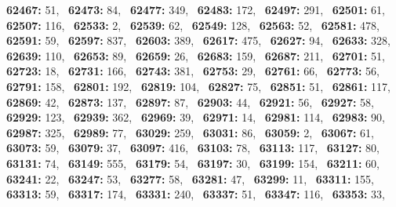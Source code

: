 \textbf{62467:} 51,\allowbreak~ 
\textbf{62473:} 84,\allowbreak~ 
\textbf{62477:} 349,\allowbreak~ 
\textbf{62483:} 172,\allowbreak~ 
\textbf{62497:} 291,\allowbreak~ 
\textbf{62501:} 61,\allowbreak~ 
\textbf{62507:} 116,\allowbreak~ 
\textbf{62533:} 2,\allowbreak~ 
\textbf{62539:} 62,\allowbreak~ 
\textbf{62549:} 128,\allowbreak~ 
\textbf{62563:} 52,\allowbreak~ 
\textbf{62581:} 478,\allowbreak~ 
\textbf{62591:} 59,\allowbreak~ 
\textbf{62597:} 837,\allowbreak~ 
\textbf{62603:} 389,\allowbreak~ 
\textbf{62617:} 475,\allowbreak~ 
\textbf{62627:} 94,\allowbreak~ 
\textbf{62633:} 328,\allowbreak~ 
\textbf{62639:} 110,\allowbreak~ 
\textbf{62653:} 89,\allowbreak~ 
\textbf{62659:} 26,\allowbreak~ 
\textbf{62683:} 159,\allowbreak~ 
\textbf{62687:} 211,\allowbreak~ 
\textbf{62701:} 51,\allowbreak~ 
\textbf{62723:} 18,\allowbreak~ 
\textbf{62731:} 166,\allowbreak~ 
\textbf{62743:} 381,\allowbreak~ 
\textbf{62753:} 29,\allowbreak~ 
\textbf{62761:} 66,\allowbreak~ 
\textbf{62773:} 56,\allowbreak~ 
\textbf{62791:} 158,\allowbreak~ 
\textbf{62801:} 192,\allowbreak~ 
\textbf{62819:} 104,\allowbreak~ 
\textbf{62827:} 75,\allowbreak~ 
\textbf{62851:} 51,\allowbreak~ 
\textbf{62861:} 117,\allowbreak~ 
\textbf{62869:} 42,\allowbreak~ 
\textbf{62873:} 137,\allowbreak~ 
\textbf{62897:} 87,\allowbreak~ 
\textbf{62903:} 44,\allowbreak~ 
\textbf{62921:} 56,\allowbreak~ 
\textbf{62927:} 58,\allowbreak~ 
\textbf{62929:} 123,\allowbreak~ 
\textbf{62939:} 362,\allowbreak~ 
\textbf{62969:} 39,\allowbreak~ 
\textbf{62971:} 14,\allowbreak~ 
\textbf{62981:} 114,\allowbreak~ 
\textbf{62983:} 90,\allowbreak~ 
\textbf{62987:} 325,\allowbreak~ 
\textbf{62989:} 77,\allowbreak~ 
\textbf{63029:} 259,\allowbreak~ 
\textbf{63031:} 86,\allowbreak~ 
\textbf{63059:} 2,\allowbreak~ 
\textbf{63067:} 61,\allowbreak~ 
\textbf{63073:} 59,\allowbreak~ 
\textbf{63079:} 37,\allowbreak~ 
\textbf{63097:} 416,\allowbreak~ 
\textbf{63103:} 78,\allowbreak~ 
\textbf{63113:} 117,\allowbreak~ 
\textbf{63127:} 80,\allowbreak~ 
\textbf{63131:} 74,\allowbreak~ 
\textbf{63149:} 555,\allowbreak~ 
\textbf{63179:} 54,\allowbreak~ 
\textbf{63197:} 30,\allowbreak~ 
\textbf{63199:} 154,\allowbreak~ 
\textbf{63211:} 60,\allowbreak~ 
\textbf{63241:} 22,\allowbreak~ 
\textbf{63247:} 53,\allowbreak~ 
\textbf{63277:} 58,\allowbreak~ 
\textbf{63281:} 47,\allowbreak~ 
\textbf{63299:} 11,\allowbreak~ 
\textbf{63311:} 155,\allowbreak~ 
\textbf{63313:} 59,\allowbreak~ 
\textbf{63317:} 174,\allowbreak~ 
\textbf{63331:} 240,\allowbreak~ 
\textbf{63337:} 51,\allowbreak~ 
\textbf{63347:} 116,\allowbreak~ 
\textbf{63353:} 33,\allowbreak~ 
